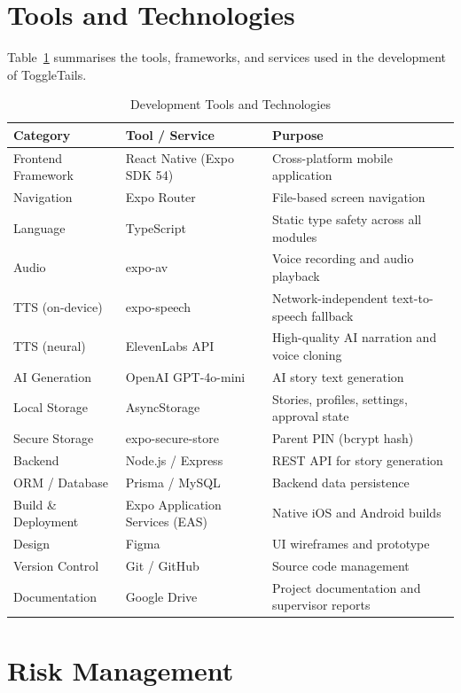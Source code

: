 \section{Tools and Technologies}

Table~\ref{tab:tools} summarises the tools, frameworks, and services used in the development of ToggleTails.

\begin{table}[h!]
\centering
\caption{Development Tools and Technologies}
\label{tab:tools}
\renewcommand{\arraystretch}{1.3}
\begin{tabularx}{\textwidth}{|l|l|X|}
\hline
\textbf{Category} & \textbf{Tool / Service} & \textbf{Purpose} \\
\hline
Frontend Framework & React Native (Expo SDK 54) & Cross-platform mobile application \\
Navigation & Expo Router & File-based screen navigation \\
Language & TypeScript & Static type safety across all modules \\
Audio & expo-av & Voice recording and audio playback \\
TTS (on-device) & expo-speech & Network-independent text-to-speech fallback \\
TTS (neural) & ElevenLabs API & High-quality AI narration and voice cloning \\
AI Generation & OpenAI GPT-4o-mini & AI story text generation \\
Local Storage & AsyncStorage & Stories, profiles, settings, approval state \\
Secure Storage & expo-secure-store & Parent PIN (bcrypt hash) \\
Backend & Node.js / Express & REST API for story generation \\
ORM / Database & Prisma / MySQL & Backend data persistence \\
Build \& Deployment & Expo Application Services (EAS) & Native iOS and Android builds \\
Design & Figma & UI wireframes and prototype \\
Version Control & Git / GitHub & Source code management \\
Documentation & Google Drive & Project documentation and supervisor reports \\
\hline
\end{tabularx}
\end{table}

\section{Risk Management}

